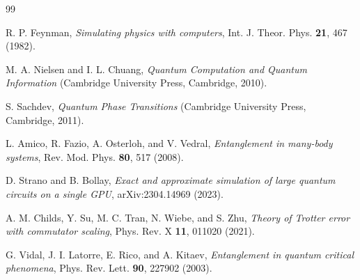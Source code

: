 \documentclass[aps,pra,reprint,superscriptaddress,nofootinbib]{revtex4-2}
\begin{document}
\begin{thebibliography}{99}

R. P. Feynman,
\textit{Simulating physics with computers},
Int. J. Theor. Phys. \textbf{21}, 467 (1982).

M. A. Nielsen and I. L. Chuang,
\textit{Quantum Computation and Quantum Information}
(Cambridge University Press, Cambridge, 2010).

S. Sachdev,
\textit{Quantum Phase Transitions}
(Cambridge University Press, Cambridge, 2011).

L. Amico, R. Fazio, A. Osterloh, and V. Vedral,
\textit{Entanglement in many-body systems},
Rev. Mod. Phys. \textbf{80}, 517 (2008).

D. Strano and B. Bollay,
\textit{Exact and approximate simulation of large quantum circuits on a single GPU},
arXiv:2304.14969 (2023).

A. M. Childs, Y. Su, M. C. Tran, N. Wiebe, and S. Zhu,
\textit{Theory of Trotter error with commutator scaling},
Phys. Rev. X \textbf{11}, 011020 (2021).

G. Vidal, J. I. Latorre, E. Rico, and A. Kitaev,
\textit{Entanglement in quantum critical phenomena},
Phys. Rev. Lett. \textbf{90}, 227902 (2003).

\end{thebibliography}
\end{document}
